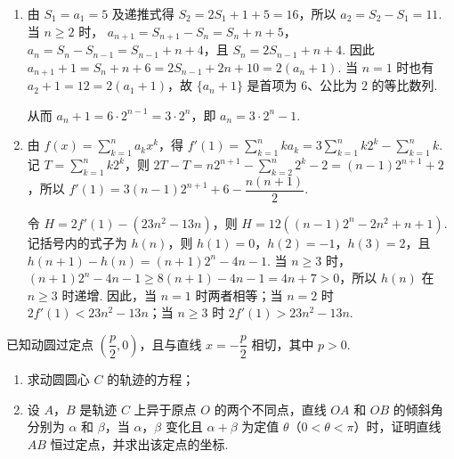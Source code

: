 \begin{solution}
\begin{enumerate}
\item
由 \(S_1=a_1=5\) 及递推式得 \(S_2=2S_1+1+5=16\)，所以 \(a_2=S_2-S_1=11\). 当 \(n\geqslant2\) 时，
\(a_{n+1}=S_{n+1}-S_n=S_n+n+5\)，
\(a_n=S_n-S_{n-1}=S_{n-1}+n+4\)，且 \(S_n=2S_{n-1}+n+4\). 因此
\(a_{n+1}+1=S_n+n+6=2S_{n-1}+2n+10=2(a_n+1)\). 当 \(n=1\) 时也有 \(a_2+1=12=2(a_1+1)\)，故 \(\{a_n+1\}\) 是首项为 \(6\)、公比为 \(2\) 的等比数列.

从而 \(a_n+1=6\cdot2^{n-1}=3\cdot2^n\)，即
\(a_n=3\cdot2^n-1\).

\item
由 \(f(x)=\sum_{k=1}^{n}a_kx^k\)，得
\(f'(1)=\sum_{k=1}^{n}ka_k=3\sum_{k=1}^{n}k2^k-\sum_{k=1}^{n}k\). 记 \(T=\sum_{k=1}^{n}k2^k\)，则
\(2T-T=n2^{n+1}-\sum_{k=2}^{n}2^k-2=(n-1)2^{n+1}+2\)，所以
\(f'(1)=3(n-1)2^{n+1}+6-\dfrac{n(n+1)}{2}\).

令
\(H=2f'(1)-(23n^2-13n)\)，则
\(H=12\left((n-1)2^n-2n^2+n+1\right)\). 记括号内的式子为 \(h(n)\)，则 \(h(1)=0\)，\(h(2)=-1\)，\(h(3)=2\)，且
\(h(n+1)-h(n)=(n+1)2^n-4n-1\). 当 \(n\geqslant3\) 时，\((n+1)2^n-4n-1\geqslant8(n+1)-4n-1=4n+7>0\)，所以 \(h(n)\) 在 \(n\geqslant3\) 时递增. 因此，当 \(n=1\) 时两者相等；当 \(n=2\) 时 \(2f'(1)<23n^2-13n\)；当 \(n\geqslant3\) 时 \(2f'(1)>23n^2-13n\).
\end{enumerate}
\end{solution}

\begin{problem}
已知动圆过定点 \(\left(\dfrac{p}{2},0\right)\)，且与直线 \(x=-\dfrac{p}{2}\) 相切，其中 \(p>0\).

\begin{enumerate}
\item 求动圆圆心 \(C\) 的轨迹的方程；
\item 设 \(A\)，\(B\) 是轨迹 \(C\) 上异于原点 \(O\) 的两个不同点，直线 \(OA\) 和 \(OB\) 的倾斜角分别为 \(\alpha\) 和 \(\beta\)，当 \(\alpha\)，\(\beta\) 变化且 \(\alpha+\beta\) 为定值 \(\theta\)（\(0<\theta<\pi\)）时，证明直线 \(AB\) 恒过定点，并求出该定点的坐标.
\end{enumerate}
\end{problem}

